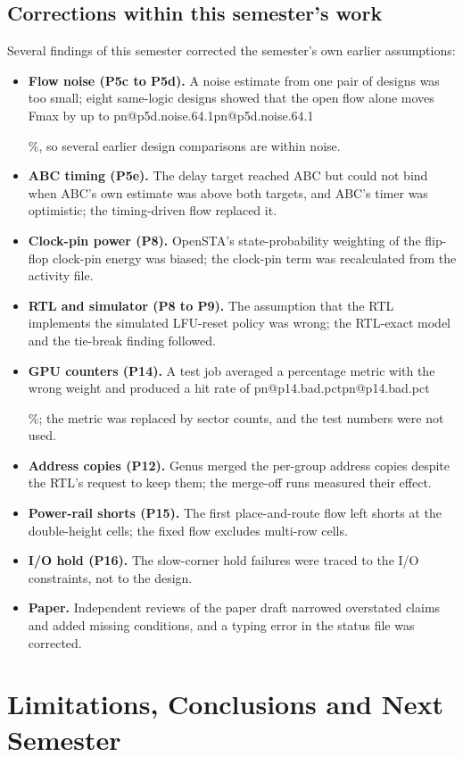 \documentclass[11pt,a4paper]{report}
\makeatletter
\DeclareRobustCommand{\R}[1]{\ifcsname pn@#1\endcsname\csname pn@#1\endcsname\else
  \PackageError{report}{number key '#1' is not defined in macros.tex}{Run tools/make_paper_macros.py --target report}\fi}
\makeatother
\begin{document}
\section{Corrections within this semester's work}
Several findings of this semester corrected the semester's own earlier assumptions:
\begin{itemize}
\item \textbf{Flow noise (P5c to P5d).} A noise estimate from one pair of designs was too small; eight same-logic
designs showed that the open flow alone moves Fmax by up to \R{p5d.noise.64.1}\%, so several earlier design
comparisons are within noise.
\item \textbf{ABC timing (P5e).} The delay target reached ABC but could not bind when ABC's own estimate was above both targets, and ABC's timer was optimistic; the timing-driven flow replaced it.
\item \textbf{Clock-pin power (P8).} OpenSTA's state-probability weighting of the flip-flop clock-pin energy was
biased; the clock-pin term was recalculated from the activity file.
\item \textbf{RTL and simulator (P8 to P9).} The assumption that the RTL implements the simulated LFU-reset policy was
wrong; the RTL-exact model and the tie-break finding followed.
\item \textbf{GPU counters (P14).} A test job averaged a percentage metric with the wrong weight and produced a hit rate of \R{p14.bad.pct}\%; the metric was replaced by sector counts, and the test numbers were not used.
\item \textbf{Address copies (P12).} Genus merged the per-group address copies despite the RTL's request to keep them;
the merge-off runs measured their effect.
\item \textbf{Power-rail shorts (P15).} The first place-and-route flow left shorts at the double-height cells; the
fixed flow excludes multi-row cells.
\item \textbf{I/O hold (P16).} The slow-corner hold failures were traced to the I/O constraints, not to the design.
\item \textbf{Paper.} Independent reviews of the paper draft narrowed overstated claims and added missing conditions, and a typing error in the status file was corrected.
\end{itemize}

\chapter{Limitations, Conclusions and Next Semester}\label{ch:concl}
\end{document}
